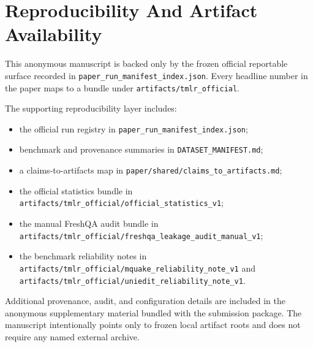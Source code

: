 \section{Reproducibility And Artifact Availability}

This anonymous manuscript is backed only by the frozen official reportable surface recorded in \texttt{paper\_run\_manifest\_index.json}. Every headline number in the paper maps to a bundle under \texttt{artifacts/tmlr\_official}.

The supporting reproducibility layer includes:
\begin{itemize}[leftmargin=1.5em]
\item the official run registry in \texttt{paper\_run\_manifest\_index.json};
\item benchmark and provenance summaries in \texttt{DATASET\_MANIFEST.md};
\item a claims-to-artifacts map in \texttt{paper/shared/claims\_to\_artifacts.md};
\item the official statistics bundle in \texttt{artifacts/tmlr\_official/official\_statistics\_v1};
\item the manual FreshQA audit bundle in \texttt{artifacts/tmlr\_official/freshqa\_leakage\_audit\_manual\_v1};
\item the benchmark reliability notes in \texttt{artifacts/tmlr\_official/mquake\_reliability\_note\_v1} and \texttt{artifacts/tmlr\_official/uniedit\_reliability\_note\_v1}.
\end{itemize}

Additional provenance, audit, and configuration details are included in the anonymous supplementary material bundled with the submission package. The manuscript intentionally points only to frozen local artifact roots and does not require any named external archive.


